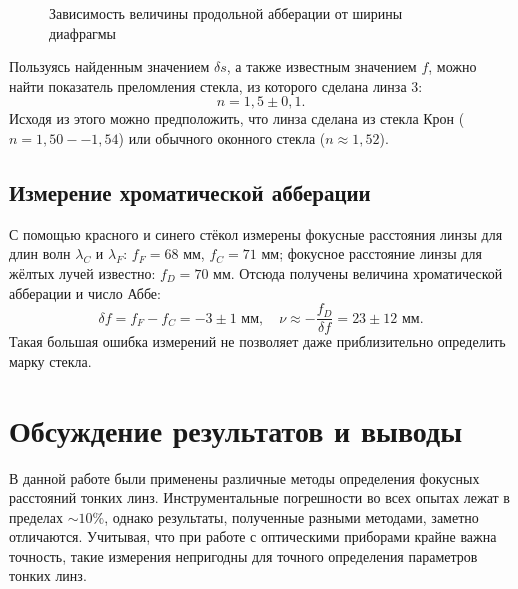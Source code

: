 \documentclass[a4paper,12pt]{article} %
\begin{document}
\begin{figure}[h] \label{graph:interpoll}
\begin{center}
\caption{Зависимость величины продольной абберации от ширины диафрагмы}
\end{center}
\end{figure}

Пользуясь найденным значением $\delta s$, а также известным значением $f$, можно найти показатель преломления стекла, из которого сделана линза 3:
$$n = 1,5 \pm 0,1.$$
Исходя из этого можно предположить, что линза сделана из стекла Крон ($n = 1,50--1,54$) или обычного оконного стекла ($n\approx1,52$).

\subsection{Измерение хроматической абберации}

С помощью красного и синего стёкол измерены фокусные расстояния линзы для длин волн $\lambda_C$ и $\lambda_F$: $f_F = 68$ мм, $f_C = 71$ мм; фокусное расстояние линзы для жёлтых лучей известно: $f_D = 70$ мм. Отсюда получены величина хроматической абберации и число Аббе:
$$\delta f = f_F - f_C = -3\pm1\text{ мм},\quad \nu \approx -\frac{f_D}{\delta f} = 23\pm12\text{ мм}.$$
Такая большая ошибка измерений не позволяет даже приблизительно определить марку стекла.

\section{Обсуждение результатов и выводы}

В данной работе были применены различные методы определения фокусных расстояний тонких линз. Инструментальные погрешности во всех опытах лежат в пределах $\sim10\%$, однако результаты, полученные разными методами, заметно отличаются. Учитывая, что при работе с оптическими приборами крайне важна точность, такие измерения непригодны для точного определения параметров тонких линз.
\end{document}
